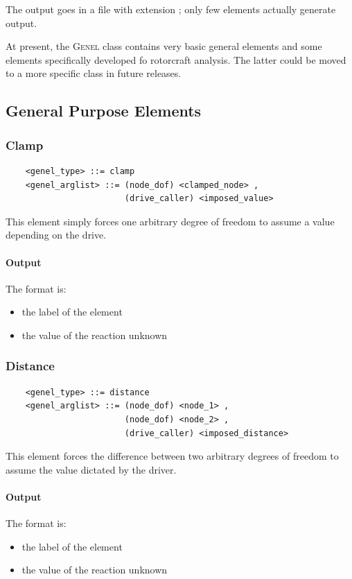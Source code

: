 \noindent
The output goes in a file with extension ; only few elements
actually generate output.

\noindent
At present, the \textsc{Genel} class contains very basic general elements
and some elements specifically developed fo rotorcraft analysis.
The latter could be moved to a more specific class in future releases.

\subsection{General Purpose Elements}
   
\subsubsection{Clamp}
\label{sec:EL:GENEL:CLAMP}
\begin{verbatim}
    <genel_type> ::= clamp
    <genel_arglist> ::= (node_dof) <clamped_node> ,
                        (drive_caller) <imposed_value>
\end{verbatim}
This element simply forces one arbitrary degree of freedom to assume a value
depending on the drive.

\paragraph{Output}
The format is:
\begin{itemize}
    \item the label of the element
    \item the value of the reaction unknown
\end{itemize}
  
\subsubsection{Distance}
\label{sec:EL:GENEL:DISTANCE}
\begin{verbatim}
    <genel_type> ::= distance
    <genel_arglist> ::= (node_dof) <node_1> ,
                        (node_dof) <node_2> ,
                        (drive_caller) <imposed_distance>
\end{verbatim}
This element forces the difference between two arbitrary degrees of freedom
to assume the value dictated by the driver.

\paragraph{Output}
The format is:
\begin{itemize}
    \item the label of the element
    \item the value of the reaction unknown
\end{itemize}
  
